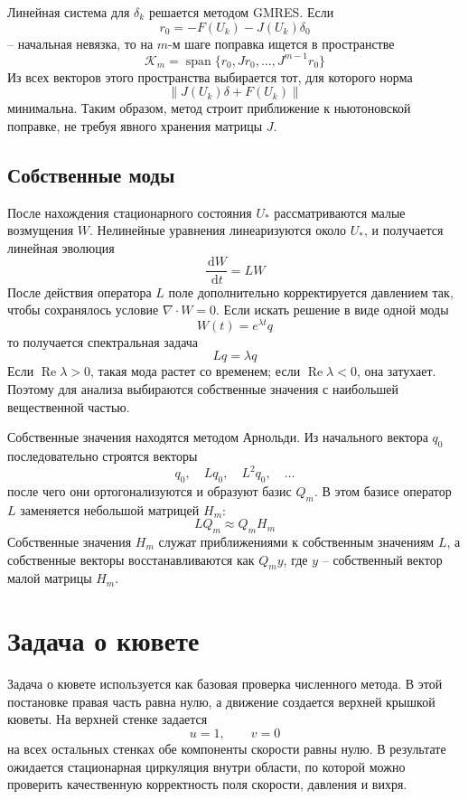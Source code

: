 \documentclass[12pt,a4paper]{article}
\newcommand{\dd}{\,\mathrm{d}}
\newcommand{\norm}[1]{\left\lVert #1 \right\rVert}
\begin{document}
Линейная система для \(\delta_k\) решается методом GMRES. Если
\[
    r_0=-F(U_k)-J(U_k)\delta_0
\]
-- начальная невязка, то на \(m\)-м шаге поправка ищется в пространстве
\[
    \mathcal{K}_m
    =
    \operatorname{span}\{r_0,Jr_0,\dots,J^{m-1}r_0\}
\]
Из всех векторов этого пространства выбирается тот, для которого норма
\[
    \norm{J(U_k)\delta+F(U_k)}
\]
минимальна. Таким образом, метод строит приближение к ньютоновской поправке,
не требуя явного хранения матрицы \(J\).

\subsection{Собственные моды}

После нахождения стационарного состояния \(U_*\) рассматриваются малые
возмущения \(W\). Нелинейные уравнения линеаризуются около \(U_*\), и
получается линейная эволюция
\[
    \frac{\dd W}{\dd t}=LW
\]
После действия оператора \(L\) поле дополнительно корректируется давлением
так, чтобы сохранялось условие \(\nabla\cdot W=0\). Если искать решение в
виде одной моды
\[
    W(t)=e^{\lambda t}q
\]
то получается спектральная задача
\[
    Lq=\lambda q
\]
Если \(\operatorname{Re}\lambda>0\), такая мода растет со временем; если
\(\operatorname{Re}\lambda<0\), она затухает. Поэтому для анализа выбираются
собственные значения с наибольшей вещественной частью.

Собственные значения находятся методом Арнольди. Из начального вектора
\(q_0\) последовательно строятся векторы
\[
    q_0,\quad Lq_0,\quad L^2q_0,\quad \dots
\]
после чего они ортогонализуются и образуют базис \(Q_m\). В этом базисе
оператор \(L\) заменяется небольшой матрицей \(H_m\):
\[
    LQ_m\approx Q_mH_m
\]
Собственные значения \(H_m\) служат приближениями к собственным значениям
\(L\), а собственные векторы восстанавливаются как \(Q_m y\), где \(y\) --
собственный вектор малой матрицы \(H_m\).

\section{Задача о кювете}

Задача о кювете используется как базовая проверка численного метода. В этой
постановке правая часть равна нулю, а движение создается верхней крышкой
кюветы. На верхней стенке задается
\[
    u=1,\qquad v=0
\]
на всех остальных стенках обе компоненты скорости равны нулю. В результате
ожидается стационарная циркуляция внутри области, по которой можно проверить
качественную корректность поля скорости, давления и вихря.
\end{document}
